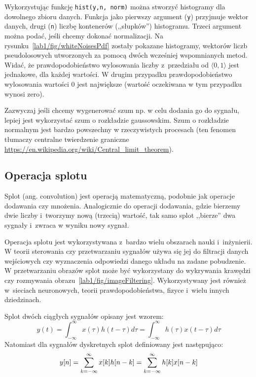 Wykorzystując funkcję \texttt{hist(y,n, norm)} można stworzyć histogramy dla dowolnego zbioru danych. Funkcja jako pierwszy argument (\texttt{y}) przyjmuje wektor danych, drugi (\texttt{n}) liczbę kontenerów (,,słupków'') histogramu. Trzeci argument można podać, jeśli chcemy dokonać normalizacji. Na rysunku~\ref{lab1/fig/whiteNoisesPdf} zostały pokazane histogramy, wektorów liczb pseudolosowych utworzonych za pomocą dwóch wcześniej wspomnianych metod. Widać, że prawdopodobieństwo wylosowania liczby z~przedziału od $\langle 0,1 \rangle$ jest jednakowe, dla każdej wartości. W drugim przypadku prawdopodobieństwo wylosowania wartości $0$ jest największe (wartość oczekiwana w tym przypadku wynosi zero).

Zazwyczaj jeśli chcemy wygenerować szum np. w celu dodania go do sygnału, lepiej jest wykorzystać szum o rozkładzie gaussowskim. Szum o rozkładzie normalnym jest bardzo powszechny w rzeczywistych procesach (ten fenomen tłumaczy centralne twierdzenie graniczne \url{https://en.wikipedia.org/wiki/Central_limit_theorem}). 

\subsection{Operacja splotu}\label{lab1/sec/convolution}
Splot (ang. convolution) jest operacją matematyczną, podobnie jak operacje dodawania czy mnożenia. Analogicznie do operacji dodawania, gdzie bierzemy dwie liczby i~tworzymy nową (trzecią) wartość, tak samo splot ,,bierze'' dwa sygnały i~zwraca w wyniku nowy sygnał. 

Operacja splotu jest wykorzystywana z~bardzo wielu obszarach nauki i~inżynierii. W teorii sterowania czy przetwarzaniu sygnałów używa się jej do filtracji danych wejściowych czy wyznaczenia odpowiedzi danego układu na zadane pobudzenie. W przetwarzaniu obrazów splot może być wykorzystany do wykrywania krawędzi czy rozmywania obrazu~\ref{lab1/fig/imageFiltering}. Wykorzystywany jest również w~sieciach neuronowych, teorii prawdopodobieństwa, fizyce i~wielu innych dziedzinach.


Splot dwóch ciągłych sygnałów opisany jest wzorem:
\begin{equation}
	y(t) = \int_{-\infty}^{\infty}x(\tau)h(t-\tau)d\tau=\int_{-\infty}^{\infty}h(\tau)x(t-\tau)d\tau 
\end{equation}
Natomiast dla sygnałów dyskretnych splot definiowany jest następująco:
\begin{equation}
	y[n]=\sum_{k=-\infty}^{\infty}x[k]h[n-k]=\sum_{k=-\infty}^{\infty}h[k]x[n-k]\\ 
\end{equation}

